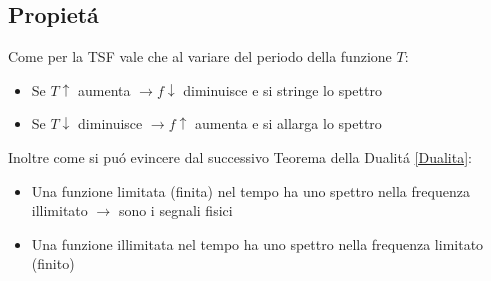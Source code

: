             \begin{figure}[H]
                \centering
                \hfill
            \end{figure}
            
    \subsection{Propietá}
        Come per la TSF vale che al variare del periodo della funzione $T$:
            \begin{itemize}
                \item Se $T\uparrow$ aumenta $ \rightarrow f\downarrow$ diminuisce e si stringe lo spettro  
                \item Se $T\downarrow$ diminuisce $ \rightarrow f\uparrow$ aumenta e si allarga lo spettro  
            \end{itemize}
        Inoltre come si puó evincere dal successivo Teorema della Dualitá \ref{Dualita}:
            \begin{itemize}
                \item Una funzione limitata (finita) nel tempo ha uno spettro nella frequenza illimitato $\rightarrow$ sono i segnali fisici   
                \item Una funzione illimitata nel tempo ha uno spettro nella frequenza limitato (finito)
            \end{itemize}

